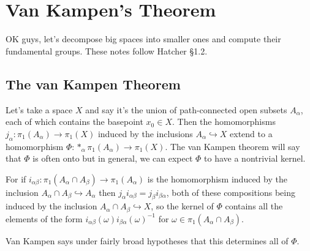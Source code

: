 \section{Van Kampen's Theorem}
OK guys, let's decompose big spaces into smaller ones and compute their fundamental groups. These notes follow Hatcher \S 1.2.
\subsection{The van Kampen Theorem}
Let's take a space $X$ and say it's the union of path-connected open subsets $A_{\alpha}$, each of which contains the basepoint $x_0\in X$. Then the homomorphisms $j_{\alpha} \colon \pi_1(A_{\alpha}) \to \pi_1(X)$ induced by the inclusions $A_{\alpha}\hookrightarrow X$ extend to a homomorphism $\Phi \colon *_{\alpha}\pi_1(A_{\alpha}) \to \pi_1(X)$. The van Kampen theorem will say that $\Phi$ is often onto but in general, we can expect $\Phi$ to have a nontrivial kernel. 

For if $i_{\alpha\beta} \colon  \pi_1(A_{\alpha}\cap A_{\beta}) \to \pi_1(A_{\alpha})$ is the homomorphism induced by the inclusion $A_{\alpha}\cap A_{\beta}\hookrightarrow A_{\alpha}$ then $j_{\alpha}i_{\alpha\beta}=j_{\beta}i_{\beta\alpha}$, both of these compositions being induced by the inclusion $A_{\alpha}\cap A_{\beta}\hookrightarrow X$, so the kernel of $\Phi$ contains all the elements of the form $i_{\alpha\beta}(\omega)i_{\beta\alpha}(\omega)^{-1}$ for $\omega \in \pi_1(A_{\alpha}\cap A_{\beta})$. 

Van Kampen says under fairly broad hypotheses that this determines all of $\Phi$.

